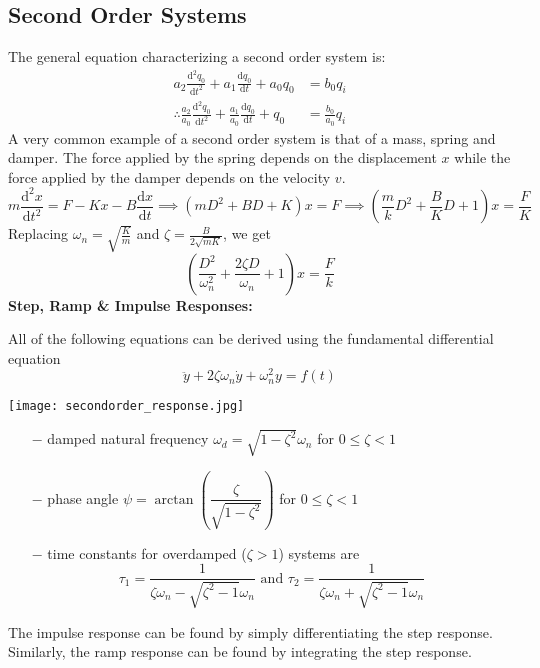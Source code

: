 \documentclass[11pt]{article}
\theoremstyle{definition}
\begin{document}
\subsection{Second Order Systems}
The general equation characterizing a second order system is:
\begin{align*}
	a_2\frac{\text{d}^2q_0}{\text{d}t^2}+a_1\frac{\text{d}q_0}{\text{d}t}+a_0q_0&=b_0q_i\\
	\therefore \frac{a_2}{a_0}\frac{\text{d}^2q_0}{\text{d}t^2}+\frac{a_1}{a_0}\frac{\text{d}q_0}{\text{d}t}+q_0&=\frac{b_0}{a_0}q_i
\end{align*}
A very common example of a second order system is that of a mass, spring and damper. The force applied by the spring depends on the displacement $x$ while the force applied by the damper depends on the velocity $v$.
\newpage
$$m\frac{\text{d}^2x}{\text{d}t^2}=F-Kx-B\frac{\text{d}x}{\text{d}t}\implies (mD^2+BD+K)x=F\implies \left(\frac{m}{k}D^2+\frac{B}{K}D+1\right)x=\frac{F}{K}$$
Replacing $\displaystyle \omega_n=\sqrt{\frac{K}{m}}$ and $\displaystyle \zeta=\frac{B}{2\sqrt{mK}}$, we get
$$\left(\frac{D^2}{\omega_n^2}+\frac{2\zeta D}{\omega_n}+1\right)x=\frac{F}{k}$$
\textbf{\large Step, Ramp \& Impulse Responses:}

All of the following equations can be derived using the fundamental differential equation $$\ddot{y}+2\zeta\omega_n\dot{y}+\omega_n^2y=f(t)$$
\begin{center}
\texttt{[image: secondorder\_response.jpg]}
\end{center}
\begin{itemize}
	\itemsep0em
	\item[$-$] damped natural frequency $\omega_d=\sqrt{1-\zeta^2}\omega_n$ for $0\leqslant\zeta<1$
	\item[$-$] phase angle $\psi=\arctan(\dfrac{\zeta}{\sqrt{1-\zeta^2}})$ for $0\leqslant\zeta<1$
	\item[$-$] time constants for overdamped ($\zeta>1$) systems are
	$$\tau_1=\frac{1}{\zeta\omega_n-\sqrt{\zeta^2-1}\omega_n}\text{ and }\tau_2=\frac{1}{\zeta\omega_n+\sqrt{\zeta^2-1}\omega_n}$$
\end{itemize}
The impulse response can be found by simply differentiating the step response. Similarly, the ramp response can be found by integrating the step response. 
\end{document}
